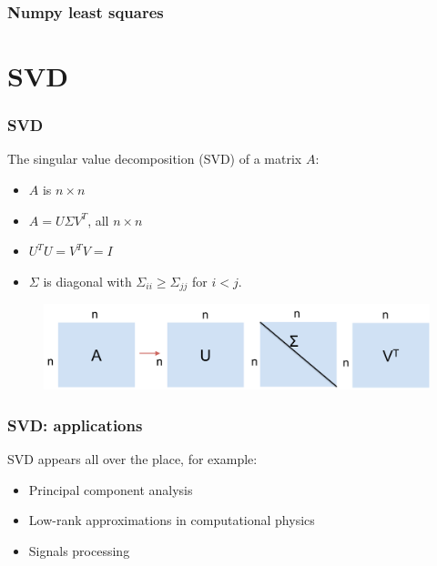 \documentclass{beamer}
\begin{document}
\begin{frame}
\frametitle{Numpy least squares}


\end{frame}

\section{SVD}

\begin{frame}
\frametitle{SVD}

The singular value decomposition (SVD) of a matrix $A$:
\begin{itemize}
\item $A$ is $n \times n$
\item $A = U\Sigma V^T$, all $n \times n$
\item $U^TU = V^TV = I$
\item $\Sigma$ is diagonal with $\Sigma_{ii} \ge \Sigma_{jj}$ for $i < j$.
\end{itemize}

\begin{figure}
\includegraphics[scale=0.4]{figs/svd.pdf}
\end{figure}

\end{frame}

\begin{frame}
\frametitle{SVD: applications}

SVD appears all over the place, for example:

\vspace{1cm}

\begin{itemize}
\item Principal component analysis
\item Low-rank approximations in computational physics
\item Signals processing
\end{itemize}

\end{frame}
\end{document}
